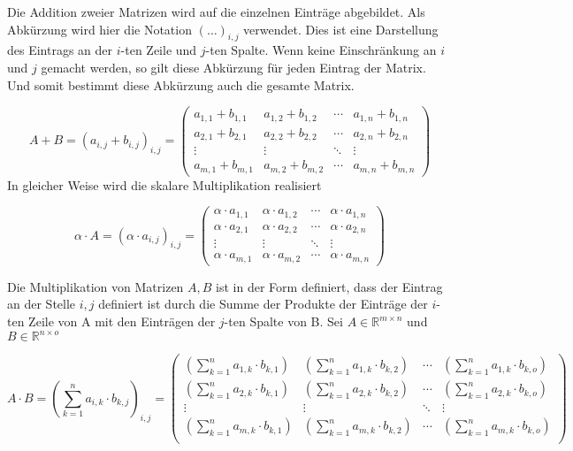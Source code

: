Die Addition zweier Matrizen wird auf die einzelnen Einträge abgebildet. Als Abkürzung wird hier die Notation $(\dots)_{i,j}$ verwendet. Dies ist eine Darstellung des Eintrags an der $i$-ten Zeile und $j$-ten Spalte. Wenn keine Einschränkung an $i$ und $j$ gemacht werden, so gilt diese Abkürzung für jeden Eintrag der Matrix. Und somit bestimmt diese Abkürzung auch die gesamte Matrix.

\begin{equation*}
A + B = \left( a_{i,j} + b_{i,j} \right)_{i,j} = \begin{pmatrix}
a_{1,1}+b_{1,1} & a_{1,2}+b_{1,2} & \cdots & a_{1,n}+b_{1,n} \\
a_{2,1}+b_{2,1} & a_{2,2}+b_{2,2} & \cdots & a_{2,n}+b_{2,n} \\
\vdots & \vdots & \ddots & \vdots \\
a_{m,1}+b_{m,1} & a_{m,2}+b_{m,2} & \cdots & a_{m,n}+b_{m,n}
\end{pmatrix}
\end{equation*}
In gleicher Weise wird die skalare Multiplikation realisiert

\begin{equation*}
\alpha \cdot A = \left( \alpha \cdot a_{i,j} \right)_{i,j} = \begin{pmatrix}
\alpha \cdot a_{1,1} & \alpha \cdot a_{1,2} & \cdots & \alpha \cdot a_{1,n} \\
\alpha \cdot a_{2,1} & \alpha \cdot a_{2,2} & \cdots & \alpha \cdot a_{2,n} \\
\vdots & \vdots & \ddots & \vdots \\
\alpha \cdot a_{m,1} & \alpha \cdot a_{m,2} & \cdots & \alpha \cdot a_{m,n}
\end{pmatrix}
\end{equation*}

Die Multiplikation von Matrizen $A,B$ ist in der Form definiert, dass der Eintrag an der Stelle $i,j$ definiert ist durch die Summe der Produkte der Einträge der $i$-ten Zeile von A mit den Einträgen der $j$-ten Spalte von B. Sei $A\in \mathbb{R}^{m\times n}$ und $B\in \mathbb{R}^{n\times o}$

\begin{equation*}
A \cdot B = \left( \sum_{k=1}^{n} a_{i,k} \cdot b_{k,j} \right)_{i,j} = \begin{pmatrix}
\left( \sum_{k=1}^{n} a_{1,k} \cdot b_{k,1} \right) & \left( \sum_{k=1}^{n} a_{1,k} \cdot b_{k,2} \right) & \cdots & \left( \sum_{k=1}^{n} a_{1,k} \cdot b_{k,o} \right) \\
\left( \sum_{k=1}^{n} a_{2,k} \cdot b_{k,1} \right) & \left( \sum_{k=1}^{n} a_{2,k} \cdot b_{k,2} \right) & \cdots & \left( \sum_{k=1}^{n} a_{2,k} \cdot b_{k,o} \right) \\
\vdots & \vdots & \ddots & \vdots \\
\left( \sum_{k=1}^{n} a_{m,k} \cdot b_{k,1} \right) & \left( \sum_{k=1}^{n} a_{m,k} \cdot b_{k,2} \right) & \cdots & \left( \sum_{k=1}^{n} a_{m,k} \cdot b_{k,o} \right) \\
\end{pmatrix}
\end{equation*}

